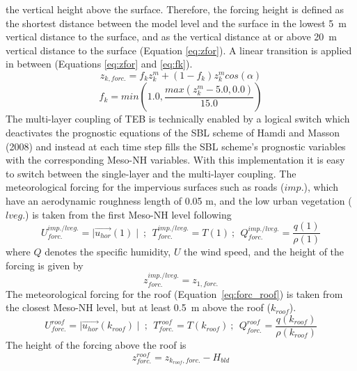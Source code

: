 the vertical height above the surface. Therefore, the forcing height is defined as the shortest
distance between the model level and the surface in the lowest 5~m vertical distance to the surface,
and as the vertical distance at or above 20~m vertical distance to the surface (Equation \ref{eq:zfor}).
A linear transition is applied in between (Equations \ref{eq:zfor} and \ref{eq:fk}).
%
\begin{equation}
\label{eq:zfor}
z_{k,forc.} = f_{k} z^{m}_{k} + (1 - f_{k}) z^{m}_{k} cos(\alpha)
\end{equation}
%
\begin{equation}
\label{eq:fk}
f_{k} = min \left(1.0,\frac{max(z^{m}_{k}-5.0,0.0)}{15.0}\right)
\end{equation}
%
The multi-layer coupling of TEB is technically enabled by a logical switch which deactivates
the prognostic equations of the SBL scheme of Hamdi and Masson (2008) and instead at each time step
fills the SBL scheme's prognostic variables with the corresponding Meso-NH variables.
With this implementation it is easy to switch between the single-layer and the multi-layer coupling.
The meteorological forcing for the impervious surfaces such as roads ($imp.$), which have an
aerodynamic roughness length of 0.05 m, and the low urban vegetation ($lveg.$) is taken from
the first Meso-NH level following
%
\begin{equation}
\label{eq:forc_can}
U^{imp./lveg.}_{forc.} = \mid \vec{u_{hor}}(1) \mid \ ; \ \ T^{imp./lveg.}_{forc.} = T(1) \ ; \ \ Q^{imp./lveg.}_{forc.} = \frac{q(1)}{\rho(1)}
\end{equation}
%
where $Q$ denotes the specific humidity, $U$ the wind speed, and the height of the forcing is given by
%
\begin{equation}
\label{eq:zforc_can}
z^{imp./lveg.}_{forc.} = z_{1,forc.} 
\end{equation}
%
The meteorological forcing for the roof (Equation~\ref{eq:forc_roof}) is taken
from the closest Meso-NH level, but at least 0.5~m above the roof ($k_{roof}$).
%
\begin{equation}
\label{eq:forc_roof}
U^{roof}_{forc.} = \mid \vec{u_{hor}}(k_{roof}) \mid \ ; \ \ T^{roof}_{forc.} = T(k_{roof}) \ ; \ \ Q^{roof}_{forc.} = \frac{q(k_{roof})}{\rho(k_{roof})} 
\end{equation}
%
The height of the forcing above the roof is
%
\begin{equation}
\label{eq:zforc_roof}
z^{roof}_{forc.} = z_{k_{roof},forc.} - H_{bld}
\end{equation}
